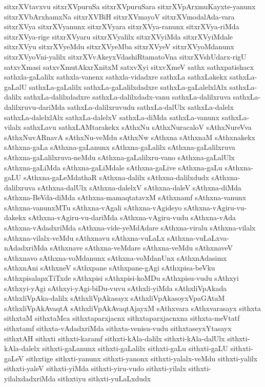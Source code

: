 {sitxrXVtavxvu
sitxrXVpuruSa
sitxrXVpuruSara
sitxrXVpArxmuKayxte-yanunx
sitxrXVbArxhamxNa
sitxrXVBiH
sitxrXVmayoV
sitxrXVmodalAda-vara
sitxrXVya
sitxrXVyanunx
sitxrXVyara
sitxrXVya-ranunx
sitxrXVya-riMda
sitxrXVya-rige
sitxrXVyaru
sitxrXVyalilx
sitxrXVyiMda
sitxrXVyiMdale
sitxrXVyu
sitxrXVyeMdu
sitxrXVyeMba
sitxrXVyeV
sitxrXVyoMdanunx
sitxrXVyoVni-yalilx
sitxrXVvAkeyxVdashiRtamatoVna
sitxrXVshUdarx-rigU
satxvXmasi
satxvXmutAkxrXnitxM
satxvXyi
sitxvXmeV
sathx
sathxpatishacx
sathxla-gaLalilx
sathxla-vanenx
sathxla-vidadxre
sathxLa
sathxLakekx
sathxLa-gaLalU
sathxLa-gaLalilx
sathxLa-gaLalilxdadxre
sathxLa-gaLalelxlAlx
sathxLa-dalilx
sathxLa-dalilxdadxre
sathxLa-dalilxdadx-vanu
sathxLa-dalilxruva
sathxLa-dalilxruvu-dariMda
sathxLa-dalilxruvudu
sathxLa-dalUlx
sathxLa-dalelx
sathxLa-dalelxlAlx
sathxLa-dalelxV
sathxLa-diMda
sathxLa-vanunx
sathxLa-vilalx
sathxLavu
sathxLAMtarakekx
sAthxNu
sAthxNuracaloV
sAthxNureVva
sAthxNuvARnavA
sAthxNu-veMdu
sAthxNw
sAthxna
sAthxnaM
sAthxnakekx
sAthxna-gaLa
sAthxna-gaLanunx
sAthxna-gaLalilx
sAthxna-gaLalilxruva
sAthxna-gaLalilxruva-neMdu
sAthxna-gaLalilxru-vano
sAthxna-gaLalUlx
sAthxna-gaLiMda
sAthxna-gaLiMdale
sAthxna-gaLive
sAthxna-gaLu
sAthxna-gaLU
sAthxna-gaLeMdathaR
sAthxna-dalilx
sAthxna-dalilxdudx
sAthxna-dalilxruva
sAthxna-dalUlx
sAthxna-dalelxV
sAthxna-daleV
sAthxna-diMda
sAthxna-BeVda-diMda
sAthxna-mamaqtatavxM
sAthxnamf
sAthxna-vanunx
sAthxna-vanunxMTu
sAthxna-vAgali
sAthxna-vAgideyo
sAthxna-vAgiru-vu-dakekx
sAthxna-vAgiru-vu-dariMda
sAthxna-vAgiru-vudu
sAthxna-vAda
sAthxna-vAdadxriMda
sAthxna-vide-yeMdAdare
sAthxna-viralu
sAthxna-vilalx
sAthxna-vilalx-veMdu
sAthxnavu
sAthxna-vuLaLx
sAthxna-vuLaLxva-nAdadxriMda
sAthxnave
sAthxna-veMdare
sAthxna-veMdu
sAthxnaveV
sAthxnavo
sAthxna-voMdanunx
sAthxna-voMdanUnx
sAthxnAdasimx
sAthxnAni
sAthxneV
sAthxpane
sAthxpane-gAgi
sAthxpisa-beVku
sAthxpisalapxTiTxde
sAthxpisi
sAthxpisi-koMDu
sAthxpisu-vudu
sAthxyi
sAthxyi-yAgi
sAthxyi-yAgi-biDu-vuvu
sAthxli-yiMda
sAthxliVpAkada
sAthxliVpAka-dalilx
sAthxliVpAkasayx
sAthxliVpAkasoyxVpaGAtaM
sAthxliVpAkAvaqtA
sAthxliVpAkAvaqtAjayxM
sAthxvara
sAthxvarasayx
sithxta
sithxtaM
sithxtaMca
sithxtaparxjacnx
sithxtaparxjacnxna
sithxta-meVtatf
sithxtamf
sithxta-vAdadxriMda
sithxta-venisu-vudu
sithxtaseyxYtasayx
sithxtAH
sithxti
sithxti-karamf
sithxti-kAla-dalilx
sithxti-kAla-dalUlx
sithxti-kAla-dalelx
sithxti-gaLanunx
sithxti-gaLalilx
sithxti-gaLu
sithxti-gaLU
sithxti-gaLeV
sithxtige
sithxti-yanunx
sithxti-yanonx
sithxti-yalalx-veMdu
sithxti-yalilx
sithxti-yaleV
sithxti-yiMda
sithxti-yiru-vudo
sithxti-yilalx
sithxti-yilalxdadxriMda
sithxtiyu
sithxti-yuLaLxdudx
}
